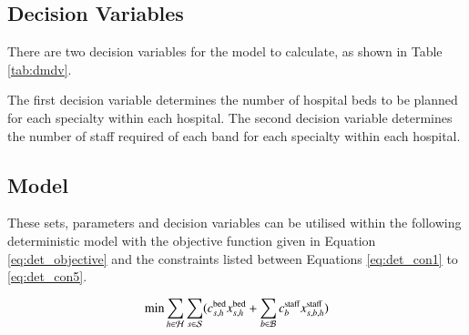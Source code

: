 \documentclass[../thesis.tex]{subfiles}
\begin{document}
\subsection{Decision Variables}
There are two decision variables for the model to calculate, as shown in Table \ref{tab:dmdv}.
\begin{table}[h!]
    \centering{}
    \caption{The decision variables used within the deterministic model where \(b,s,h\) represent the variable number of nursing bands, specialties and hospitals, respectively.}
    \label{tab:dmdv}
\end{table}


The first decision variable determines the number of hospital beds to be planned for each specialty within each hospital. The second decision variable determines the number of staff required of each band for each specialty within each hospital.

\subsection{Model}\label{sec:deterministicmodel}
These sets, parameters and decision variables can be utilised within the following deterministic model with the objective function given in Equation \eqref{eq:det_objective} and the constraints listed between Equations \eqref{eq:det_con1} to \eqref{eq:det_con5}.


\begin{equation}\label{eq:det_objective}
    \text{min} \sum_{h\in\mathcal{H}}\sum_{s\in\mathcal{S}}(c^\textnormal{bed}_{s,h}x^\textnormal{bed}_{s,h} + \sum_{b\in\mathcal{B}}c^\textnormal{staff}_{b}x^\textnormal{staff}_{s,b,h})
\end{equation}
\end{document}
